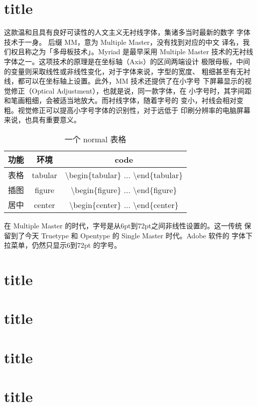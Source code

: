 \documentclass[oneside]{fduthesis}
\begin{document}
\section{title}
这款温和且具有良好可读性的人文主义无衬线字体，集诸多当时最新的数字
字体技术于一身。 后缀 MM，意为 Multiple Master，没有找到对应的中文
译名，我们权且称之为「多母板技术」。Myriad 是最早采用 Multiple Master
技术的无衬线字体之一。这项技术的原理是在坐标轴（Axis）的区间两端设计
极限母板，中间的变量则采取线性或非线性变化，对于字体来说，字型的宽度、
粗细甚至有无衬线，都可以在坐标轴上设置。此外，MM 技术还提供了在小字号
下屏幕显示的视觉修正（Optical Adjustment），也就是说，同一款字体，在
小字号时，其字间距和笔画粗细，会被适当地放大。而衬线字体，随着字号的
变小，衬线会相对变粗。视觉修正可以提高小字号字体的识别性，对于远低于
印刷分辨率的电脑屏幕来说，也具有重要意义。

\begin{table}[h]
  \centering
  \caption{一个 normal 表格}
  \begin{tabular}{ccc}
    \hline
    \bfseries 功能 & \bfseries 环境 & \bfseries code \\
    \hline
    表格 & tabular & \ttfamily \backslash begin\{tabular\} ... \backslash end\{tabular\} \\
    插图 & figure  & \ttfamily \backslash begin\{figure\}  ... \backslash end\{figure\}  \\
    居中 & center  & \ttfamily \backslash begin\{center\}  ... \backslash end\{center\}  \\
    \hline
  \end{tabular}
\end{table}

在 Multiple Master 的时代，字号是从6pt到72pt之间非线性设置的。这一传统
保留到了今天 Truetype 和 Opentype 的 Single Master 时代。Adobe 软件的
字体下拉菜单，仍然只显示6到72pt 的字号。

\section{title}
\section{title}
\section{title}
\section{title}
\end{document}

